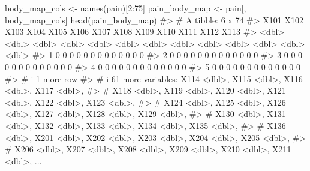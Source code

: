 \documentclass[
  letterpaper,
]{krantz}
\makeatletter
\newenvironment{Shaded}{\begin{snugshade}}{\end{snugshade}}
\newcommand{\CommentTok}[1]{\textcolor[rgb]{0.37,0.37,0.37}{#1}}
\newcommand{\DecValTok}[1]{\textcolor[rgb]{0.68,0.00,0.00}{#1}}
\newcommand{\FunctionTok}[1]{\textcolor[rgb]{0.28,0.35,0.67}{#1}}
\newcommand{\NormalTok}[1]{\textcolor[rgb]{0.00,0.23,0.31}{#1}}
\newcommand{\OtherTok}[1]{\textcolor[rgb]{0.00,0.23,0.31}{#1}}
\newcommand{\SpecialCharTok}[1]{\textcolor[rgb]{0.37,0.37,0.37}{#1}}
\newenvironment{kframe}{%
\medskip{}
\setlength{\fboxsep}{.8em}
 \def\at@end@of@kframe{}%
 \ifinner\ifhmode%
  \def\at@end@of@kframe{\end{minipage}}%
  \begin{minipage}{\columnwidth}%
 \fi\fi%
 \def\FrameCommand##1{\hskip\@totalleftmargin \hskip-\fboxsep
 \colorbox{shadecolor}{##1}\hskip-\fboxsep
     \hskip-\linewidth \hskip-\@totalleftmargin \hskip\columnwidth}%
 \MakeFramed {\advance\hsize-\width
   \@totalleftmargin\z@ \linewidth\hsize
   \@setminipage}}%
 {\par\unskip\endMakeFramed%
 \at@end@of@kframe}
\renewenvironment{Shaded}{\begin{kframe}}{\end{kframe}}
\makeatother
\begin{document}
\begin{Shaded}
\begin{Highlighting}[]
\NormalTok{body\_map\_cols }\OtherTok{\textless{}{-}} \FunctionTok{names}\NormalTok{(pain)[}\DecValTok{2}\SpecialCharTok{:}\DecValTok{75}\NormalTok{]}
\NormalTok{pain\_body\_map }\OtherTok{\textless{}{-}}\NormalTok{ pain[, body\_map\_cols]}
\FunctionTok{head}\NormalTok{(pain\_body\_map)}
\CommentTok{\#\textgreater{} \# A tibble: 6 x 74}
\CommentTok{\#\textgreater{}    X101  X102  X103  X104  X105  X106  X107  X108  X109  X110  X111  X112  X113}
\CommentTok{\#\textgreater{}   \textless{}dbl\textgreater{} \textless{}dbl\textgreater{} \textless{}dbl\textgreater{} \textless{}dbl\textgreater{} \textless{}dbl\textgreater{} \textless{}dbl\textgreater{} \textless{}dbl\textgreater{} \textless{}dbl\textgreater{} \textless{}dbl\textgreater{} \textless{}dbl\textgreater{} \textless{}dbl\textgreater{} \textless{}dbl\textgreater{} \textless{}dbl\textgreater{}}
\CommentTok{\#\textgreater{} 1     0     0     0     0     0     0     0     0     0     0     0     0     0}
\CommentTok{\#\textgreater{} 2     0     0     0     0     0     0     0     0     0     0     0     0     0}
\CommentTok{\#\textgreater{} 3     0     0     0     0     0     0     0     0     0     0     0     0     0}
\CommentTok{\#\textgreater{} 4     0     0     0     0     0     0     0     0     0     0     0     0     0}
\CommentTok{\#\textgreater{} 5     0     0     0     0     0     0     0     0     0     0     0     0     0}
\CommentTok{\#\textgreater{} \# i 1 more row}
\CommentTok{\#\textgreater{} \# i 61 more variables: X114 \textless{}dbl\textgreater{}, X115 \textless{}dbl\textgreater{}, X116 \textless{}dbl\textgreater{}, X117 \textless{}dbl\textgreater{},}
\CommentTok{\#\textgreater{} \#   X118 \textless{}dbl\textgreater{}, X119 \textless{}dbl\textgreater{}, X120 \textless{}dbl\textgreater{}, X121 \textless{}dbl\textgreater{}, X122 \textless{}dbl\textgreater{}, X123 \textless{}dbl\textgreater{},}
\CommentTok{\#\textgreater{} \#   X124 \textless{}dbl\textgreater{}, X125 \textless{}dbl\textgreater{}, X126 \textless{}dbl\textgreater{}, X127 \textless{}dbl\textgreater{}, X128 \textless{}dbl\textgreater{}, X129 \textless{}dbl\textgreater{},}
\CommentTok{\#\textgreater{} \#   X130 \textless{}dbl\textgreater{}, X131 \textless{}dbl\textgreater{}, X132 \textless{}dbl\textgreater{}, X133 \textless{}dbl\textgreater{}, X134 \textless{}dbl\textgreater{}, X135 \textless{}dbl\textgreater{},}
\CommentTok{\#\textgreater{} \#   X136 \textless{}dbl\textgreater{}, X201 \textless{}dbl\textgreater{}, X202 \textless{}dbl\textgreater{}, X203 \textless{}dbl\textgreater{}, X204 \textless{}dbl\textgreater{}, X205 \textless{}dbl\textgreater{},}
\CommentTok{\#\textgreater{} \#   X206 \textless{}dbl\textgreater{}, X207 \textless{}dbl\textgreater{}, X208 \textless{}dbl\textgreater{}, X209 \textless{}dbl\textgreater{}, X210 \textless{}dbl\textgreater{}, X211 \textless{}dbl\textgreater{}, ...}
\end{Highlighting}
\end{Shaded}
\end{document}
